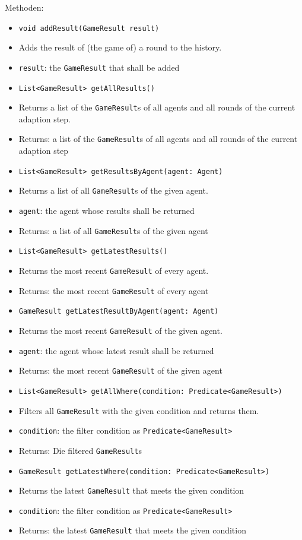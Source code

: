 \documentclass[parskip=full,11pt]{scrartcl}
\begin{document}
Methoden:
\begin{itemize}\itemsep -10pt
	\item \texttt{void addResult(GameResult result)}
	\item[] Adds the result of (the game of) a round to the history.
	\item[] \texttt{result}: the \texttt{GameResult} that shall be added
	\item \texttt{List<GameResult> getAllResults()}
	\item[] Returns a list of the \texttt{GameResult}s of all agents and all rounds of the current adaption step.
	\item[]Returns: a list of the \texttt{GameResult}s of all agents and all rounds of the current adaption step
	\item \texttt{List<GameResult> getResultsByAgent(agent: Agent)}
	\item[] Returns a list of all \texttt{GameResult}s of the given agent.
	\item[] \texttt{agent}: the agent whose results shall be returned
	\item[]Returns: a list of all \texttt{GameResult}s of the given agent
	\item \texttt{List<GameResult> getLatestResults()}
	\item[] Returns the most recent \texttt{GameResult} of every agent.
	\item[]Returns: the most recent \texttt{GameResult} of every agent
	\item \texttt{GameResult getLatestResultByAgent(agent: Agent)}
	\item[] Returns the most recent \texttt{GameResult} of the given agent.
	\item[] \texttt{agent}: the agent whose latest result shall be returned
	\item[]Returns: the most recent \texttt{GameResult} of the given agent
	\item \texttt{List<GameResult> getAllWhere(condition: Predicate<GameResult>)}
	\item[] Filters all \texttt{GameResult} with the given condition and returns them.
	\item[]\texttt{condition}: the filter condition as \texttt{Predicate<GameResult>}
	\item[]Returns: Die filtered \texttt{GameResult}s
	\item \texttt{GameResult getLatestWhere(condition: Predicate<GameResult>)}
	\item[] Returns the latest \texttt{GameResult} that meets the given condition
	\item[]\texttt{condition}: the filter condition as \texttt{Predicate<GameResult>}
	\item[]Returns: the latest \texttt{GameResult} that meets the given condition
\end{itemize}
\end{document}
